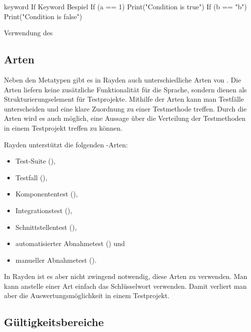 \begin{program}
\begin{JavaCode}
keyword If Keyword Bespiel {
	If (a == 1) {
		Print("Condition is true")
	}
	If (b == "b") {
		Print("Condition is false")
	}
}
\end{JavaCode}
\caption{Verwendung des }
\label{prog:ifKeywordUsage}
\end{program}

\subsection{Arten}
\label{cha:KeywordTypes}

Neben den Metatypen gibt es in Rayden auch unterschiedliche Arten von . Die Arten liefern keine zusätzliche Funktionalität für die Sprache, sondern dienen als Strukturierungselement für Testprojekte. Mithilfe der Arten kann man Testfälle unterscheiden und eine klare Zuordnung zu einer Testmethode treffen. Durch die Arten wird es auch möglich, eine Aussage über die Verteilung der Testmethoden in einem Testprojekt treffen zu können. 

\SuperPar
Rayden unterstützt die folgenden -Arten:

\begin{itemize}
\item Test-Suite (),
\item Testfall (),
\item Komponententest (),
\item Integrationstest (),
\item Schnittstellentest (),
\item automatisierter Abnahmetest () und
\item manueller Abnahmetest ().
\end{itemize}

\SuperPar
In Rayden ist es aber nicht zwingend notwendig, diese Arten zu verwenden. Man kann anstelle einer Art einfach das Schlüsselwort  verwenden. Damit verliert man aber die Auswertungsmöglichkeit in einem Testprojekt. 

\subsection{Gültigkeitsbereiche}
\label{cha:KeywordScope}

